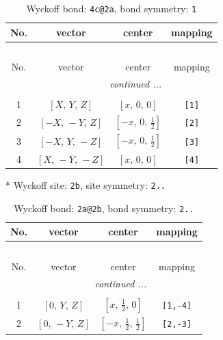\documentclass[fleqn,8pt]{jsarticle}
\begin{document}
\renewcommand{\arraystretch}{1.2}
\begin{longtable}{cccc}
\caption{Wyckoff bond: {\tt 4c@2a}, bond symmetry: {\tt 1}}
 \\
 \hline \hline
No. & vector & center & mapping \\ \hline \endfirsthead

\multicolumn{3}{l}{\tablename\ \thetable{}} \\
 \hline \hline
No. & vector & center & mapping \\ \hline \endhead

 \hline \hline
\multicolumn{3}{r}{\footnotesize\it continued ...} \\ \endfoot

 \hline \hline
\multicolumn{3}{r}{} \\ \endlastfoot

1 & $\left[ X,\, Y,\, Z \right]$ & $\left[ x,\, 0,\, 0 \right]$ & {\tt [1]} \\ \hline
2 & $\left[ - X,\, - Y,\, Z \right]$ & $\left[ - x,\, 0,\, \frac{1}{2} \right]$ & {\tt [2]} \\ \hline
3 & $\left[ - X,\, Y,\, - Z \right]$ & $\left[ - x,\, 0,\, \frac{1}{2} \right]$ & {\tt [3]} \\ \hline
4 & $\left[ X,\, - Y,\, - Z \right]$ & $\left[ x,\, 0,\, 0 \right]$ & {\tt [4]} \\
\end{longtable}
* Wyckoff site: {\tt 2b}, site symmetry: {\tt 2..}
\renewcommand{\arraystretch}{1.2}
\begin{longtable}{cccc}
\caption{Wyckoff bond: {\tt 2a@2b}, bond symmetry: {\tt 2..}}
 \\
 \hline \hline
No. & vector & center & mapping \\ \hline \endfirsthead

\multicolumn{3}{l}{\tablename\ \thetable{}} \\
 \hline \hline
No. & vector & center & mapping \\ \hline \endhead

 \hline \hline
\multicolumn{3}{r}{\footnotesize\it continued ...} \\ \endfoot

 \hline \hline
\multicolumn{3}{r}{} \\ \endlastfoot

1 & $\left[ 0,\, Y,\, Z \right]$ & $\left[ x,\, \frac{1}{2},\, 0 \right]$ & {\tt [1,-4]} \\ \hline
2 & $\left[ 0,\, - Y,\, Z \right]$ & $\left[ - x,\, \frac{1}{2},\, \frac{1}{2} \right]$ & {\tt [2,-3]} \\
\end{longtable}
\end{document}
